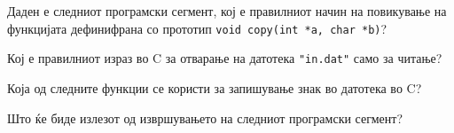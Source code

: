 \documentclass[11pt]{examdesign}
\begin{document}
\begin{multiplechoice}[title={},suppressprefix=yes]

\begin{question}
Даден е следниот програмски сегмент, кој е правилниот начин на повикување на функцијата дефинифрана со прототип \texttt{void copy(int *а, char *b)}?
\end{question}
  
\begin{question}
Кој е правилниот израз во C за отварање на датотека \texttt{"in.dat"} само за читање?
\end{question}

\begin{question}
Која од следните функции се користи за запишување знак во датотека во C?
\end{question}

\begin{question}

Што ќе биде излезот од извршувањето на следниот програмски сегмент?
\end{question}
  

\end{multiplechoice}
\end{document}
